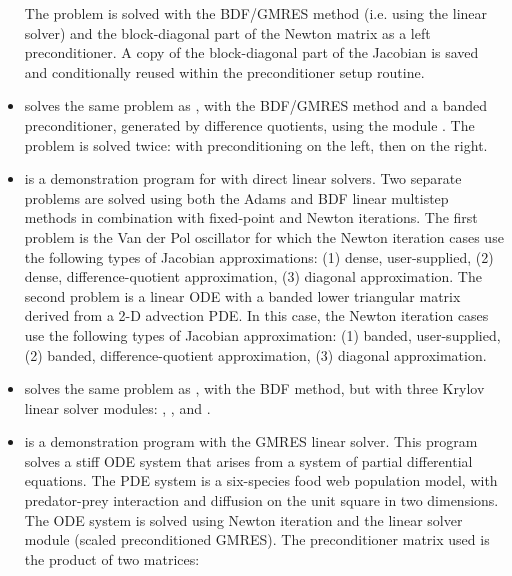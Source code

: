 \begin{itemize}
  The problem is solved with the BDF/GMRES method (i.e.    
  using the {\sunlinsolspgmr} linear solver) and the block-diagonal part of the  
  Newton matrix as a left preconditioner. A copy of the block-diagonal 
  part of the Jacobian is saved and conditionally reused within the    
  preconditioner setup routine.
\item {}
  solves the same problem as , with the BDF/GMRES method 
  and a banded preconditioner, generated by difference quotients, 
  using the module {\cvbandpre}.
  \newline
  The problem is solved twice: with preconditioning on the left,
  then on the right.
\item {}
  is a demonstration program for {\cvodes} with direct linear solvers.
  \newline
  Two separate problems are solved using both the Adams and BDF linear
  multistep methods in combination with fixed-point and Newton
  iterations. 
  \newline
  The first problem is the Van der Pol oscillator for which 
  the Newton iteration cases use the following types of Jacobian approximations:
  (1) dense, user-supplied, (2) dense, difference-quotient approximation, 
  (3) diagonal approximation. The second problem is a linear ODE with a
  banded lower triangular matrix derived from a 2-D advection PDE. In this
  case, the Newton iteration cases use the following types of Jacobian
  approximation: (1) banded, user-supplied, (2) banded, difference-quotient
  approximation, (3) diagonal approximation.
\item {}
  solves the same problem as , with the BDF method, but with
  three Krylov linear solver modules: {\sunlinsolspgmr},
  {\sunlinsolspbcgs}, and {\sunlinsolsptfqmr}. 
\item {}
  is a demonstration program with the GMRES linear solver.
  \newline
  This program solves a stiff ODE system that arises from a system     
  of partial differential equations.  The PDE system is a six-species
  food web population model, with predator-prey interaction and diffusion 
  on the unit square in two dimensions.
  \newline
  The ODE system is solved using Newton iteration and the      
  {\sunlinsolspgmr} linear solver module (scaled preconditioned GMRES).
  \newline
  The preconditioner matrix used is the product of two matrices:         

\end{itemize}
